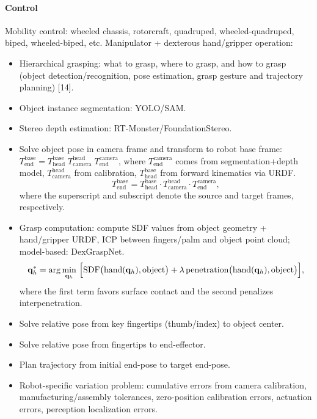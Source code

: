 \documentclass[12pt,a4paper]{article}
\begin{document}
\paragraph{Control}
Mobility control: wheeled chassis, rotorcraft, quadruped, wheeled-quadruped, biped, wheeled-biped, etc.
Manipulator + dexterous hand/gripper operation:
\begin{itemize}
\item Hierarchical grasping: what to grasp, where to grasp, and how to grasp (object detection/recognition, pose estimation, grasp gesture and trajectory planning) [14].
\item Object instance segmentation: YOLO/SAM.
\item Stereo depth estimation: RT-Monster/FoundationStereo.
\item Solve object pose in camera frame and transform to robot base frame: $T_{\mathrm{end}}^{\mathrm{base}}=T_{\mathrm{head}}^{\mathrm{base}}\;T_{\mathrm{camera}}^{\mathrm{head}}\;T_{\mathrm{end}}^{\mathrm{camera}}$, where $T_{\mathrm{end}}^{\mathrm{camera}}$ comes from segmentation+depth model, $T_{\mathrm{camera}}^{\mathrm{head}}$ from calibration, $T_{\mathrm{head}}^{\mathrm{base}}$ from forward kinematics via URDF.
\begin{equation}
T_{\mathrm{end}}^{\mathrm{base}}=T_{\mathrm{head}}^{\mathrm{base}}\cdot T_{\mathrm{camera}}^{\mathrm{head}}\cdot T_{\mathrm{end}}^{\mathrm{camera}},
\label{eq:pose-transform}
\end{equation}
where the superscript and subscript denote the source and target frames, respectively.
\item Grasp computation: compute SDF values from object geometry + hand/gripper URDF, ICP between fingers/palm and object point cloud; model-based: DexGraspNet.
\begin{equation}
\mathbf{q}_{h}^{*}=\arg\min_{\mathbf{q}_h}\ \Bigl[\mathrm{SDF}\bigl(\mathrm{hand}(\mathbf{q}_h),\mathrm{object}\bigr)
+\lambda\,\mathrm{penetration}\bigl(\mathrm{hand}(\mathbf{q}_h),\mathrm{object}\bigr)\Bigr],
\label{eq:grasp-sdf}
\end{equation}
where the first term favors surface contact and the second penalizes interpenetration.
\item Solve relative pose from key fingertips (thumb/index) to object center.
\item Solve relative pose from fingertips to end-effector.
\item Plan trajectory from initial end-pose to target end-pose.
\item Robot-specific variation problem: cumulative errors from camera calibration, manufacturing/assembly tolerances, zero-position calibration errors, actuation errors, perception localization errors.

\end{itemize}
\end{document}

